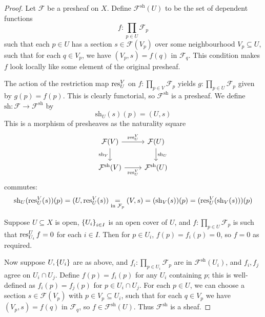 \begin{proof}
    Let \( \mathcal F \) be a presheaf on \( X \).
    Define \( \mathcal F^{\mathrm{sh}}(U) \) to be the set of dependent functions
    \[ f : \prod_{p \in U} \mathcal F_p \]
    such that each \( p \in U \) has a section \( s \in \mathcal F(V_p) \) over some neighbourhood \( V_p \subseteq U \), such that for each \( q \in V_p \), we have \( (V_p, s) = f(q) \) in \( \mathcal F_q \).
    This condition makes \( f \) look locally like some element of the original presheaf.

    The action of the restriction map \( \operatorname{res}^V_U \) on \( f : \prod_{p \in V} \mathcal F_p \) yields \( g : \prod_{p \in U} \mathcal F_p \) given by \( g(p) = f(p) \).
    This is clearly functorial, so \( \mathcal F^{\mathrm{sh}} \) is a presheaf.
    We define \( \mathrm{sh} : \mathcal F \to \mathcal F^{\mathrm{sh}} \) by
    \[ \mathrm{sh}_U(s)(p) = (U, s) \]
    This is a morphism of presheaves as the naturality square
\[\begin{tikzcd}
	{\mathcal F(V)} & {\mathcal F(U)} \\
	{\mathcal F^{\mathrm{sh}}(V)} & {\mathcal F^{\mathrm{sh}}(U)}
	\arrow["{\res^V_U}", from=1-1, to=1-2]
	\arrow["{\mathrm{sh}_U}", from=1-2, to=2-2]
	\arrow["{\mathrm{sh}_V}"', from=1-1, to=2-1]
	\arrow["{\res_U^V}"', from=2-1, to=2-2]
\end{tikzcd}\]
    commutes:
    \[ \mathrm{sh}_U(\operatorname{res}^V_U(s))(p) = (U, \operatorname{res}^V_U(s)) \underset{\text{in } \mathcal F_p}{=} (V, s) = (\mathrm{sh}_V(s))(p) = (\operatorname{res}^V_U(\mathrm{sh}_V(s)))(p) \]

    Suppose \( U \subseteq X \) is open, \( \qty{U_i}_{i \in I} \) is an open cover of \( U \), and \( f : \prod_{p \in U} \mathcal F_p \) is such that \( \operatorname{res}^U_{U_i} f = 0 \) for each \( i \in I \).
    Then for \( p \in U_i \), \( f(p) = f_i(p) = 0 \), so \( f = 0 \) as required.

    Now suppose \( U, \qty{U_i} \) are as above, and \( f_i : \prod_{p \in U_i} \mathcal F_p \) are in \( \mathcal F^{\mathrm{sh}}(U_i) \), and \( f_i, f_j \) agree on \( U_i \cap U_j \).
    Define \( f(p) = f_i(p) \) for any \( U_i \) containing \( p \); this is well-defined as \( f_i(p) = f_j(p) \) for \( p \in U_i \cap U_j \).
    For each \( p \in U \), we can choose a section \( s \in \mathcal F(V_p) \) with \( p \in V_p \subseteq U_i \), such that for each \( q \in V_p \) we have \( (V_p, s) = f(q) \) in \( \mathcal F_q \), so \( f \in \mathcal F^{\mathrm{sh}}(U) \).
    Thus \( \mathcal F^{\mathrm{sh}} \) is a sheaf.


\end{proof}
